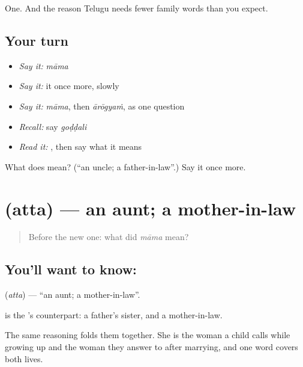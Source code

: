 \begin{grammarlens}[title={What you've built}]
One. And the reason Telugu needs fewer family words than you expect.
\end{grammarlens}

\subsection*{Your turn}
\begin{itemize}
\raggedright
  \item \emph{Say it:} \emph{māma}
  \item \emph{Say it:} it once more, slowly
  \item \emph{Say it:} \emph{māma}, then \emph{ārōgyaṁ}, as one question
  \item \emph{Recall:} say \emph{goḍḍali}
  \item \emph{Read it:} \textbf{}, then say what it means
\end{itemize}

\begin{tcolorbox}[breakable,colback=teal!4,colframe=teal!35!black,title={Before you move on}]
What does  mean? (\textquotedblleft{}an uncle; a father-in-law\textquotedblright{}.) Say it once more.
\end{tcolorbox}
\section[\texorpdfstring{\te{అత్త} (atta)}{అత్త (atta)}]{ (atta) — an aunt; a mother-in-law}

\label{lesson:TE-C71-aunt}



\begin{quote}
Before the new one: what did \emph{māma} mean?
\end{quote}

\subsection*{You'll want to know: }
\textbf{} (\emph{atta}) — \textquotedblleft{}an aunt; a mother-in-law\textquotedblright{}.

 is the 's counterpart: a father's sister, and a mother-in-law.

The same reasoning folds them together. She is the woman a child calls  while growing up and the woman they answer to after marrying, and one word covers both lives.

